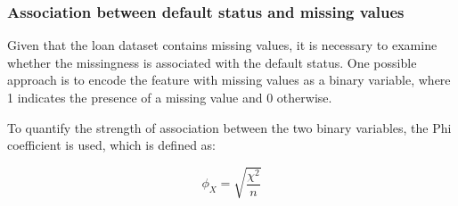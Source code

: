 \subsubsection{Association between default status and missing values}
\label{subsubsec:target-na-ass}

Given that the loan dataset contains missing values, it is necessary to examine whether the missingness is associated with the default status. One possible approach is to encode the feature with missing values as a binary variable, where 1 indicates the presence of a missing value and 0 otherwise.

To quantify the strength of association between the two binary variables, the Phi coefficient is used, which is defined as:

\begin{equation}\label{eq}
\phi_{X} = \sqrt{\frac{\chi^{2}}{n}}
\end{equation}

